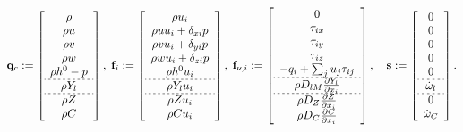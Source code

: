 \begin{equation}\label{eq:gemsGovVecs}
    \consVec \defEq \left[
    \begin{array}{c}
    \density \\
	\density \velX \\
	\density \velY \\
	\density \velZ \\
	\density \stagEnth - \pressure \\ \hdashline[2pt/2pt]
	\density \mfSpec \\ \hdashline[2pt/2pt]
	\density \mixFrac \\
	\density \progVar
    \end{array}
    \right] , \;
    \invFluxDir \defEq \left[
    \begin{array}{c}
    \density \vel_{\spatialIdx} \\
	\density \velX \vel_{\spatialIdx} + \delta_{x \spatialIdx} \pressure \\
	\density \velY \vel_{\spatialIdx} + \delta_{y \spatialIdx} \pressure \\
	\density \velZ \vel_{\spatialIdx} + \delta_{z \spatialIdx} \pressure \\
	\density \stagEnth \vel_{\spatialIdx} \\ \hdashline[2pt/2pt]
	\density \mfSpec \vel_{\spatialIdx} \\ \hdashline[2pt/2pt]
	\density \mixFrac \vel_{\spatialIdx} \\
	\density \progVar \vel_{\spatialIdx}
    \end{array}
    \right] , \;
	\viscFluxDir \defEq \left[
    \begin{array}{c}
    0 \\
	\shearStress_{\spatialIdx x} \\
	\shearStress_{\spatialIdx y} \\
	\shearStress_{\spatialIdx z} \\
	- \heatFlux_{\spatialIdx} + \sum_{\spatialIdxTwo} \vel_{\spatialIdxTwo} \shearStress_{\spatialIdx \spatialIdxTwo}\\ \hdashline[2pt/2pt]
	\density \massDiffSpec \pde{\mfSpec}{x_{\spatialIdx}} \\ \hdashline[2pt/2pt]
	\density \massDiffVar_{\mixFrac} \pde{\mixFrac}{x_{\spatialIdx}} \\
	\density \massDiffVar_{\progVar} \pde{\progVar}{x_{\spatialIdx}}
    \end{array}
    \right], \quad
	\sourceVec \defEq \left[
    \begin{array}{c}
    0 \\
	0 \\
	0 \\
	0 \\
	0 \\ \hdashline[2pt/2pt]
	\prodRateSpecFR \\ \hdashline[2pt/2pt]
	0 \\
	\prodRateFPV
    \end{array} \right].
\end{equation}
